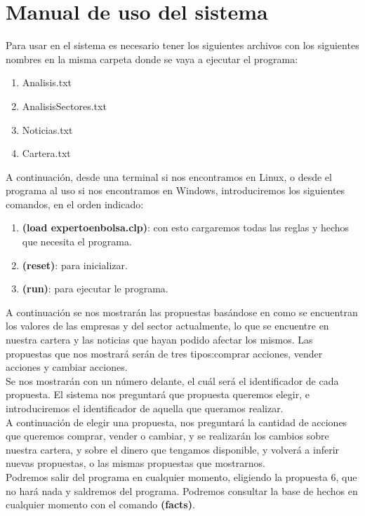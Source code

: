 \section{Manual de uso del sistema}
Para usar en el sistema es necesario tener los siguientes archivos con los siguientes nombres en la misma carpeta donde se vaya a ejecutar el programa:
\begin{enumerate}
	\item Analisis.txt
	\item AnalisisSectores.txt
	\item Noticias.txt
	\item Cartera.txt
\end{enumerate}
A continuación, desde una terminal si nos encontramos en Linux, o desde el programa al uso si nos encontramos en Windows, introduciremos los siguientes comandos, en el orden indicado:
\begin{enumerate}
	\item \textbf{(load expertoenbolsa.clp)}: con esto cargaremos todas las reglas y hechos que necesita el programa.
	\item \textbf{(reset)}: para inicializar.
	\item \textbf{(run)}: para ejecutar le programa.
\end{enumerate}
A continuación se nos mostrarán las propuestas basándose en como se encuentran los valores de las empresas y del sector actualmente, lo que se encuentre en nuestra cartera y las noticias que hayan podido afectar los mismos. Las propuestas que nos mostrará serán de tres tipos:comprar acciones, vender acciones y cambiar acciones.\\
Se nos mostrarán con un número delante, el cuál será el identificador de cada propuesta. El sistema nos preguntará que propuesta queremos elegir, e introduciremos el identificador de aquella que queramos realizar.\\
A continuación de elegir una propuesta, nos preguntará la cantidad de acciones que queremos comprar, vender o cambiar, y se realizarán los cambios sobre nuestra cartera, y sobre el dinero que tengamos disponible, y volverá a inferir nuevas propuestas, o las mismas propuestas que mostrarnos.\\
Podremos salir del programa en cualquier momento, eligiendo la propuesta 6, que no hará nada y saldremos del programa. Podremos consultar la base de hechos en cualquier momento con el comando \textbf{(facts)}.
